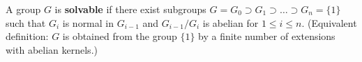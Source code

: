A group $G$ is \textbf{solvable} if there exist subgroups $G = G_0 \supset G_1 \supset \dots \supset G_n = \{1\}$ such that $G_i$ is normal in $G_{i-1}$ and $G_{i-1}/G_i$ is abelian for $1 \leq i \leq n$. (Equivalent definition: $G$ is obtained from the group $\{1\}$ by a finite number of extensions with abelian kernels.)
